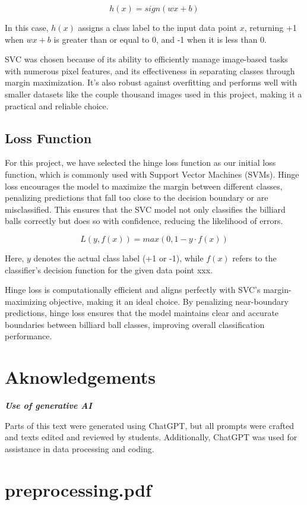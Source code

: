 \documentclass{article}
\begin{document}
\begin{equation}
    h(x)=sign(wx+b)
\end{equation}

In this case, $h(x)$ assigns a class label  to the input data point $x$, returning +1 when $wx+b$ is greater than or equal to 0, and -1 
when it is less than 0.

SVC was chosen because of its ability to efficiently manage image-based tasks with numerous pixel features, and its effectiveness in separating 
classes through margin maximization. It's also robust against overfitting and performs well with smaller datasets like the couple thousand images 
used in this project, making it a practical and reliable choice. \cite{nobleWhatSupportVector2006}

\subsection{Loss Function}
\label{sec:loss_function}
For this project, we have selected the hinge loss function as our initial loss function, which is commonly used with Support Vector Machines (SVMs). 
Hinge loss encourages the model to maximize the margin between different classes, penalizing predictions that fall too close to the decision boundary 
or are misclassified. This ensures that the SVC model not only classifies the billiard balls correctly but does so with confidence, 
reducing the likelihood of errors. \cite{bartlettClassificationRejectOption2008}

\begin{equation}
    L(y, f(x)) = max(0, 1-y \cdot f(x))
\end{equation}

Here, $y$ denotes the actual class label (+1 or -1), while $f(x)$ refers to the classifier's decision function for the given data point xxx.

Hinge loss is computationally efficient and aligns perfectly with SVC's margin-maximizing objective, making it an ideal choice. By penalizing 
near-boundary predictions, hinge loss ensures that the model maintains clear and accurate boundaries between billiard ball classes, improving 
overall classification performance. \cite{bartlettClassificationRejectOption2008}

\pagebreak
\section{Aknowledgements}
\textbf{\textit{Use of generative AI}}

Parts of this text were generated using ChatGPT, but all prompts were crafted and texts edited and reviewed by students. Additionally, 
ChatGPT was used for assistance in data processing and coding.


\printbibliography


\appendix
\section{preprocessing.pdf}


\end{document}
